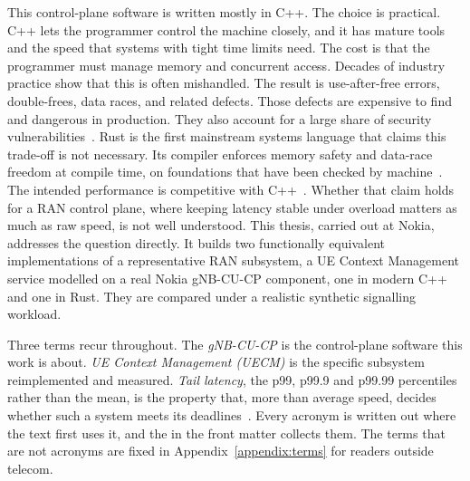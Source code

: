 \documentclass[english,oneside,a4paper,censored,csm,software-track-2020]{HYthesisML}
\begin{document}
This control-plane software is written mostly in C++. The choice is practical.
C++ lets the programmer control the machine closely, and it has mature tools
and the speed that systems with tight time limits need. The cost is that the
programmer must manage memory and concurrent access. Decades of industry
practice show that this is often mishandled. The result is use-after-free
errors, double-frees, data races, and related defects. Those defects are
expensive to find and dangerous in production. They also account for a large
share of security vulnerabilities~\cite{msrc2019memory,google2022android}.
Rust is the first mainstream systems language that claims this trade-off is
not necessary. Its compiler enforces memory safety and data-race freedom at
compile time, on foundations that have been checked by
machine~\cite{klabnik2023rust,jung2018rustbelt}. The intended performance is
competitive with C++~\cite{balasubramanian2017rust}. Whether that claim holds
for a RAN control plane, where keeping latency stable under overload matters
as much as raw speed, is not well understood. This thesis, carried out at
Nokia, addresses the question directly. It builds two functionally equivalent
implementations of a representative RAN subsystem, a UE Context Management
service modelled on a real Nokia gNB-CU-CP component, one in modern C++ and
one in Rust. They are compared under a realistic synthetic signalling
workload.

Three terms recur throughout. The \emph{gNB-CU-CP} is the control-plane software this work is
about. \emph{UE Context Management (UECM)} is the specific subsystem reimplemented and measured.
\emph{Tail latency}, the p99, p99.9 and p99.99 percentiles rather than the mean, is the property that,
more than average speed, decides whether such a system meets its
deadlines~\cite{dean2013tail,barroso2017microseconds}. Every acronym is written out where the
text first uses it, and the \nomname{} in the front matter collects them. The terms that are not
acronyms are fixed in Appendix~\ref{appendix:terms} for readers outside telecom.
\end{document}
